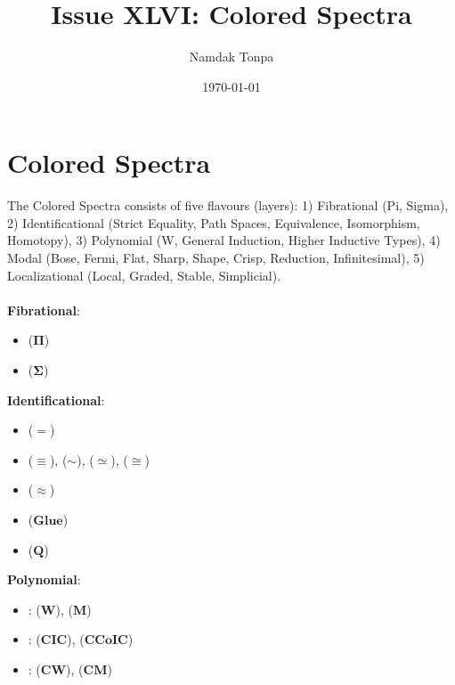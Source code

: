 \documentclass{article}
\begin{document}
\title{Issue XLVI: Colored Spectra}
\author{Namdak Tonpa}
\date{\today}

\maketitle

\begin{abstract}
\end{abstract}

\ifincludeTOC
  \tableofcontents
\fi

\section{Colored Spectra}

The Colored Spectra consists of five flavours (layers):
1) Fibrational (Pi, Sigma),
2) Identificational (Strict Equality, Path Spaces, Equivalence, Isomorphism, Homotopy),
3) Polynomial (W, General Induction, Higher Inductive Types),
4) Modal (Bose, Fermi, Flat, Sharp, Shape, Crisp, Reduction, Infinitesimal),
5) Localizational (Local, Graded, Stable, Simplicial).
\\
\\
\noindent \textbf{Fibrational}:
\begin{itemize}
\item {} ($\mathbf{\Pi}$)
\item {} ($\mathbf{\Sigma}$)
\end{itemize}

\noindent \textbf{Identificational}:
\begin{itemize}
\item {} ($\mathbf{=}$)
\item {} ($\mathbf{\equiv}$),
       ($\mathbf{\sim}$),
       ($\mathbf{\simeq}$),
       ($\mathbf{\cong}$)
\item {} ($\mathbf{\approx}$)
\item {} ($\mathbf{Glue}$)
\item {} ($\mathbf{Q}$)
\end{itemize}

\noindent \textbf{Polynomial}:
\begin{itemize}
\item {}:  ($\mathbf{W}$),  ($\mathbf{M}$)
\item {}:  ($\mathbf{CIC}$),  ($\mathbf{CCoIC}$)
\item {}:  ($\mathbf{CW}$),  ($\mathbf{CM}$)
\end{itemize}
\end{document}
